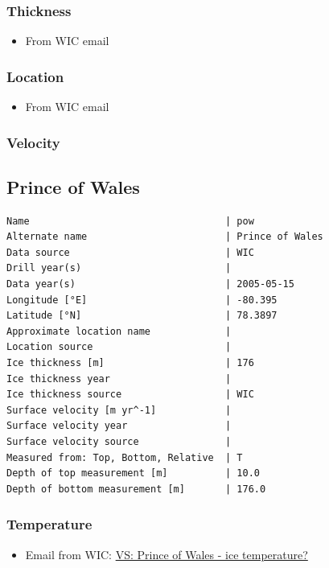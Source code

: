 \documentclass[article,a4paper,times,11pt,twoside]{article}
\begin{document}
\subsubsection{Thickness}
\label{sec:orgf831a95}

\begin{itemize}
\item From WIC email
\end{itemize}

\subsubsection{Location}
\label{sec:org4ce43cf}

\begin{itemize}
\item From WIC email
\end{itemize}

\subsubsection{Velocity}
\label{sec:orgea24c42}
\clearpage
\subsection{Prince of Wales}
\label{sec:org30f0537}
\begin{verbatim}
Name                                  | pow
Alternate name                        | Prince of Wales
Data source                           | WIC
Drill year(s)                         | 
Data year(s)                          | 2005-05-15
Longitude [°E]                        | -80.395
Latitude [°N]                         | 78.3897
Approximate location name             | 
Location source                       | 
Ice thickness [m]                     | 176
Ice thickness year                    | 
Ice thickness source                  | WIC
Surface velocity [m yr^-1]            | 
Surface velocity year                 | 
Surface velocity source               | 
Measured from: Top, Bottom, Relative  | T
Depth of top measurement [m]          | 10.0
Depth of bottom measurement [m]       | 176.0
\end{verbatim}

\subsubsection{Temperature}
\label{sec:org8aa1b43}

\begin{itemize}
\item Email from WIC: \href{msgid:AM0PR04MB61293648564AB69ACA6A02CBA2F30@AM0PR04MB6129.eurprd04.prod.outlook.com}{VS: Prince of Wales - ice temperature?}
\end{itemize}
\end{document}
